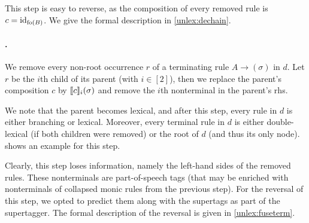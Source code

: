 \documentclass[../document.tex]{subfiles}
\begin{document}
    This step is easy to reverse, as the composition of every removed rule is $c = \operatorname{id}_{\operatorname{fo}(B)}$.
    We give the formal description in \cref{unlex:dechain}.

    \paragraph{.}
    We remove every non-root occurrence $r$ of a terminating rule $A \to (\sigma)$ in $d$.
    Let $r$ be the $i$th child of its parent (with $i \in [2]$), then we replace the parent's composition $c$ by $\llbracket c\rrbracket_i(\sigma)$ and remove the $i$th nonterminal in the parent's rhs.

    We note that the parent becomes lexical, and after this step, every rule in $d$ is either branching or lexical.
    Moreover, every terminal rule in $d$ is either double-lexical (if both children were removed) or the root of \(d\) (and thus its only node).
     shows an example for this step.

    Clearly, this step loses information, namely the left-hand sides of the removed rules.
    These nonterminals are part-of-speech tags (that may be enriched with nonterminals of collapsed monic rules from the previous step).
    For the reversal of this step, we opted to predict them along with the supertags as part of the supertagger.
    The formal description of the reversal is given in \cref{unlex:fuseterm}.
\end{document}
